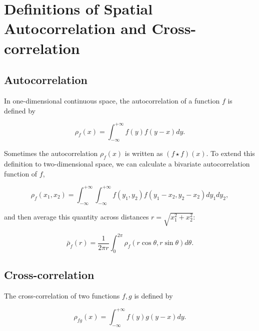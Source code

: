 \documentclass{article}
\begin{document}
\newpage

\appendix

\hypertarget{definitions-of-spatial-autocorrelation-and-cross-correlation}{%
\section{\texorpdfstring{Definitions of Spatial Autocorrelation and
Cross-correlation
\label{corr-defs}}{Definitions of Spatial Autocorrelation and Cross-correlation }}\label{definitions-of-spatial-autocorrelation-and-cross-correlation}}

\hypertarget{autocorrelation}{%
\subsection{Autocorrelation}\label{autocorrelation}}

In one-dimensional continuous space, the autocorrelation of a function
\(f\) is defined by

\begin{equation}
  \rho_f(x)=\int_{-\infty}^{+\infty}f(y)f(y-x)dy.
\end{equation}

Sometimes the autocorrelation \(\rho_f(x)\) is written as
\((f\star f)(x)\). To extend this definition to two-dimensional space,
we can calculate a bivariate autocorrelation function of \(f\),

\begin{equation}
  \rho_f(x_1,x_2)=\int_{-\infty}^{+\infty}\int_{-\infty}^{+\infty}f(y_1,y_2)f(y_1-x_2,y_2-x_2)dy_1dy_2,
\end{equation}

and then average this quantity across distances
\(r=\sqrt{x_1^2+x_2^2}\):

\begin{equation}
  \bar\rho_f(r)=\frac{1}{2\pi r}\int_0^{2\pi}\rho_f(r\cos\theta,r\sin\theta)d\theta.
\end{equation}

\hypertarget{cross-correlation}{%
\subsection{Cross-correlation}\label{cross-correlation}}

The cross-correlation of two functions \(f,g\) is defined by

\begin{equation}
  \rho_{fg}(x)=\int_{-\infty}^{+\infty}f(y)g(y-x)dy.
\end{equation}
\end{document}
